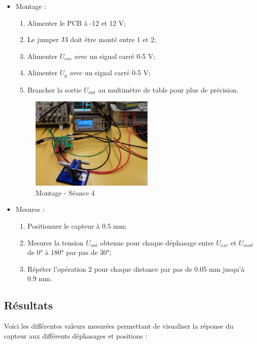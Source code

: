 \begin{itemize}
    \item Montage : 
    \begin{enumerate}
    \item Alimenter le PCB à -12 et 12 V;
    \item Le jumper J3 doit être monté entre 1 et 2; 
    \item Alimenter $U_{exc}$ avec un signal carré 0-5 V;
    \item Alimenter $U_{p}$ avec un signal carré 0-5 V;
    \item Brancher la sortie $U_{out}$ au multimètre de table pour plus de précision.
\end{enumerate}


\begin{figure}[H]
    \centering
    \includegraphics[width=6cm]{Images/Seance4/MT4.jpg}
    \caption{Montage - Séance 4 \cite{donneelabo} }
    \label{fig:lum}
\end{figure}
\item Mesures :
\begin{enumerate}
    \item Positionner le capteur à 0.5 mm;
    \item Mesurer la tension $U_{out}$ obtenue pour chaque déphasage entre $U_{exc}$ et $U_{mod}$
    de 0° à 180° par pas de 30°;
    \item Répéter l'opération 2 pour chaque distance par pas de 0.05 mm jusqu'à 0.9 mm.
\end{enumerate}
\end{itemize}

\subsection{Résultats}


Voici les différentes valeurs mesurées permettant de visualiser la réponse du capteur aux différents
déphasages et positions :

